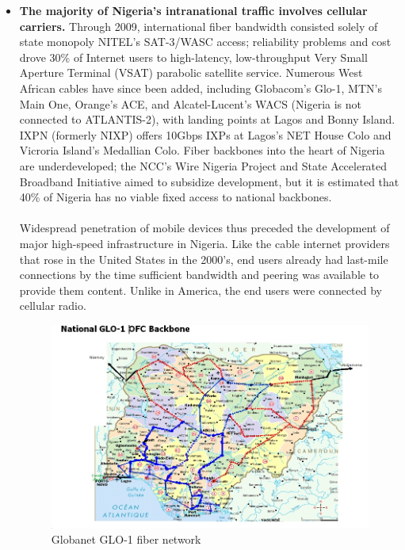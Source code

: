 \documentclass[]{sigplanconf}
\begin{document}
\begin{itemize}
\item \textbf{The majority of Nigeria's intranational traffic involves
	cellular carriers.} Through 2009, international fiber bandwidth consisted solely of state monopoly
	NITEL's SAT-3/WASC access\cite{backbone}; reliability problems and cost drove 30\%
	of Internet users to high-latency, low-throughput
	Very Small Aperture Terminal (VSAT) parabolic satellite service.
	Numerous West African cables have since been added, including
	Globacom's Glo-1, MTN's Main One, Orange's ACE, and Alcatel-Lucent's WACS
	(Nigeria is not connected to ATLANTIS-2), with landing points at
	Lagos and Bonny Island. IXPN (formerly NIXP) offers 10Gbps IXPs at
	Lagos's NET House Colo and Vicroria Island's Medallian Colo\cite{ixpn}.
	Fiber backbones into the heart of Nigeria are underdeveloped; the NCC's
	Wire Nigeria Project and State Accelerated Broadband Initiative\cite{nccwire}
	aimed to subsidize development, but it is estimated that 40\% of Nigeria
	has no viable fixed access to national backbones\cite{biztech}.
	\\
	\\
	Widespread penetration of mobile devices thus preceded the development
	of major high-speed infrastructure in Nigeria. Like the cable internet
	providers that rose in the United States in the 2000's, end users
	already had last-mile connections by the time sufficient bandwidth and
	peering was available to provide them content. Unlike in America, the
	end users were connected by cellular radio.

\begin{figure}[h]
\centering
\includegraphics[width=\linewidth]{glo-1.jpg}
\caption{Globanet GLO-1 fiber network}
\end{figure}


\end{itemize}
\end{document}
